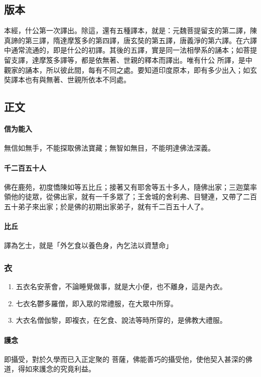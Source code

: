 \subsection{版本}
本經，什公第一次譯出。除這，還有五種譯本，就是：元魏菩提留支的第二譯，陳真諦的第三譯，隋達摩笈多的第四譯，唐玄奘的第五譯，唐義淨的第六譯。在六譯中通常流通的，即是什公的初譯。其後的五譯，實是同一法相學系的誦本；如菩提留支譯，達摩笈多譯等，都是依無著、世親的釋本而譯出。唯有什公 所譯，是中觀家的誦本，所以彼此間，每有不同之處。要知道印度原本，即有多少出入；如玄奘譯本也有與無著、世親所依本不同處。

\subsection{正文}
\paragraph{信为能入}
無信如無手，不能探取佛法寶藏；無智如無目，不能明達佛法深義。
\paragraph{千二百五十人}
佛在鹿苑，初度憍陳如等五比丘；接著又有耶舍等五十多人，隨佛出家；三迦葉率領他的徒眾，從佛出家，就有一千多眾了；王舍城的舍利弗、目犍連，又帶了二百五十弟子來出家；於是佛的初期出家弟子，就有千二百五十人了。
\paragraph{比丘}
譯為乞士，就是「外乞食以養色身，內乞法以資慧命」

\subsubsection{衣}
\begin{enumerate}
  \item 五衣名安荼會，不論睡覺做事，就是大小便，也不離身，這是內衣。
  \item 七衣名鬱多羅僧，即入眾的常禮服，在大眾中所穿。
  \item 大衣名僧伽黎，即複衣，在乞食、說法等時所穿的，是佛教大禮服。
\end{enumerate}

\paragraph{護念} 即攝受，對於久學而已入正定聚的 菩薩，佛能善巧的攝受他，使他契入甚深的佛道，得如來護念的究竟利益。
